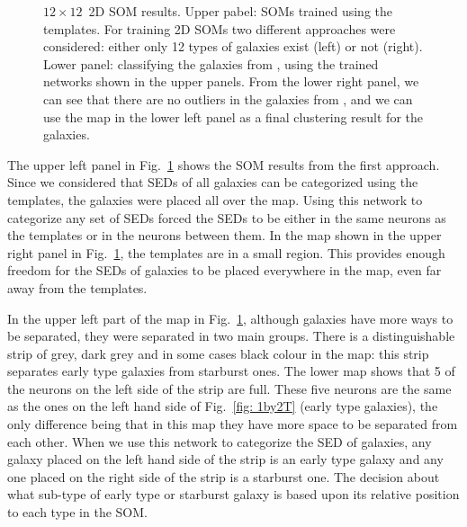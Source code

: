 \begin{figure}
\begin{subfigure}[b]{0.45\textwidth}
        \end{subfigure}
        \caption{$12\times12$~2D SOM results. Upper pabel: SOMs trained using the  templates. For training 2D SOMs two different approaches were considered: either only 12 types of galaxies exist (left) or not (right). Lower panel: classifying the galaxies from , using the trained networks shown in the upper panels. From the lower right panel, we can see that there are no outliers in the galaxies from , and we can use the map in the lower left panel as a final clustering result for the  galaxies.}
        \label{fig: 12by12}
    \end{figure}
    
    The upper left panel in Fig.~\ref{fig: 12by12} shows the SOM results from the first approach. 
    Since we considered that SEDs of all galaxies can be categorized using the  templates, the galaxies were placed all over the map.
    Using this network to categorize any set of SEDs forced the SEDs to be either in the same neurons as the  templates or in the neurons between them.
    In the map shown in the upper right panel in Fig.~\ref{fig: 12by12}, the  templates are in a small region. This provides enough freedom for the SEDs of galaxies to be placed everywhere in the map, even far away from the templates.
    
    
    In the upper left part of the map in Fig.~\ref{fig: 12by12}, although galaxies have more ways to be separated, they were separated in two main groups.
    There is a distinguishable strip of grey, dark grey and in some cases black colour in the map:
    this strip separates early type galaxies from starburst ones.
    The lower map shows that 5 of the neurons on the left side of the strip are full. 
    These five neurons are the same as the ones on the left hand side of Fig.~\ref{fig: 1by2T} (early type galaxies),
    the only difference being that in this map they have more space to be separated from each other.
    When we use this network to categorize the SED of galaxies, any galaxy placed on the left hand side of the strip is an early type galaxy and any one placed on the right side of the strip is a starburst one.
    The decision about what sub-type of early type or starburst galaxy is based upon its relative position to each type in the SOM.
    
